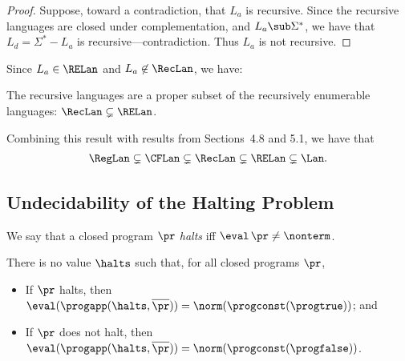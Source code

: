\begin{proof}
Suppose, toward a contradiction, that $L_a$ is recursive.
Since the recursive languages are closed under complementation,
and $L_a\sub\Sigma^*$, we have that $L_d=\Sigma^*-L_a$ is
recursive---contradiction.  Thus $L_a$ is not recursive.
\end{proof}

Since $L_a\in\RELan$ and $L_a\not\in\RecLan$, we have:

\begin{theorem}
The recursive languages are a proper subset of the recursively
enumerable languages: $\RecLan\subsetneq \RELan$.
\end{theorem}

Combining this result with results
from Sections~4.8 and 5.1, we have that
\begin{gather*}
\RegLan\subsetneq
\CFLan\subsetneq
\RecLan\subsetneq
\RELan\subsetneq
\Lan .
\end{gather*}

\subsection{Undecidability of the Halting Problem}

We say that a closed program $\pr$ \emph{halts} iff
$\eval\,\pr\neq\nonterm$.

\begin{theorem}
\label{Halting}

There is no value $\halts$ such that, for all closed programs $\pr$,
\begin{itemize}
\item If $\pr$ halts, then $\eval(\progapp(\halts,\overline{\pr})) =
  \norm(\progconst(\progtrue))$; and

\item If $\pr$ does not halt, then
  $\eval(\progapp(\halts,\overline{\pr})) =\norm(\progconst(\progfalse))$.
\end{itemize}
\end{theorem}

